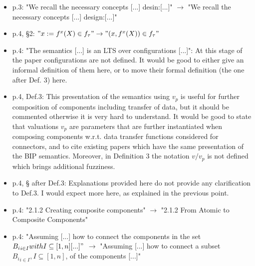\begin{itemize}
\item p.3: "We recall the necessary concepts [...] desin:[...]" $\rightarrow$ "We recall the 
necessary concepts [...] design:[...]"
\done

\item p.4, §2: $"x := f^x(X) \in f_{\tau}" \rightarrow "(x,f^x(X)) \in f_{\tau}"$
\done

\item p.4: "The semantics [...] is an LTS over configurations [...]": At this 
stage of the paper configurations are not defined. It would be good to either 
give an informal definition of them here, or to move their formal definition 
(the one after Def. 3) here.
\done
{}


\item p.4, Def.3: This presentation of the semantics using $v_p$ is useful for 
further composition of components including transfer of data, but it should 
be commented otherwise it is very hard to understand. It would be good to 
state that valuations $v_p$ are parameters that are further instantiated when 
composing components w.r.t. data transfer functions considered for 
connectors, and to cite existing papers which have the same presentation of 
the BIP semantics. Moreover, in Definition 3 the notation $v/v_p$ is not 
defined which brings additional fuzziness.

\done
{}


\item p.4, § after Def.3: Explanations provided here do not provide any 
clarification to Def.3. I would expect more here, as explained in the 
previous point.

\done

\item p.4: "2.1.2 Creating composite components" $\rightarrow$ "2.1.2 From Atomic to 
Composite Components"
\done

\item p.4: "Assuming [...] how to connect the components in the set ${B_i}_{i \in 
I} with I \subseteq [1,n] [...]"$ $\rightarrow$ "Assuming [...] how to connect a subset 
${B_i}_{i \in I}, I \subseteq [1,n]$, of the components [...]"
\done


\end{itemize}
